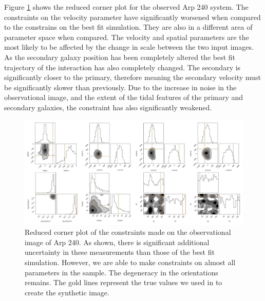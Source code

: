 Figure \ref{fig:obs_corner_plot} shows the reduced corner plot for the observed Arp 240 system. The constraints on the velocity parameter have significantly worsened when compared to the constrains on the best fit simulation. They are also in a different area of parameter space when compared. The velocity and spatial parameters are the most likely to be affected by the change in scale between the two input images. As the secondary galaxy position has been completely altered the best fit trajectory of the interaction has also completely changed. The secondary is significantly closer to the primary, therefore meaning the secondary velocity must be significantly slower than previously. Due to the increase in noise in the observational image, and the extent of the tidal features of the primary and secondary galaxies, the constraint has also significantly weakened.

\begin{figure}
    \centering
    \includegraphics[width=\textwidth]{Chapter1/figures/Arp240_obs-red-corner.pdf}
    \caption[Reduced corner plot of the constraints made on the observational image of Arp 240.]{Reduced corner plot of the constraints made on the observational image of Arp 240. As shown, there is significant additional uncertainty in these measurements than those of the best fit simulation. However, we are able to make constraints on almost all parameters in the sample. The degeneracy in the orientations remains. The gold lines represent the true values we used in to create the synthetic image.}
    \label{fig:obs_corner_plot}
\end{figure}

